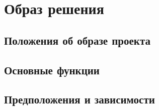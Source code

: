 \chapter{Образ решения}
\label{ch:chap2}


\section{Положения об образе проекта}
\label{sec:vision}


\section{Основные функции}
\label{sec:fun}


\section{Предположения и зависимости}
\label{sec:dep}

\endinput
